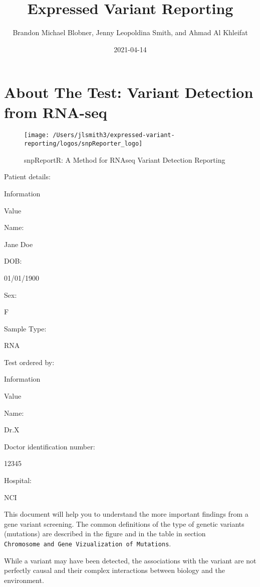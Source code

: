 \documentclass[
]{article}
\title{Expressed Variant Reporting}
\author{Brandon Michael Blobner, Jenny Leopoldina Smith, and Ahmad Al
Khleifat}
\date{2021-04-14}
\begin{document}
\maketitle

{
\setcounter{tocdepth}{3}
\tableofcontents
}
\hypertarget{about-the-test-variant-detection-from-rna-seq}{%
\section{About The Test: Variant Detection from
RNA-seq}\label{about-the-test-variant-detection-from-rna-seq}}

\begin{figure}

{\centering \texttt{[image: /Users/jlsmith3/expressed-variant-reporting/logos/snpReporter\_logo]} 

}

\caption{snpReportR: A Method for RNAseq Variant Detection Reporting}\label{fig:unnamed-chunk-3}
\end{figure}

Patient details:

Information

Value

Name:

Jane Doe

DOB:

01/01/1900

Sex:

F

Sample Type:

RNA

Test ordered by:

Information

Value

Name:

Dr.X

Doctor identification number:

12345

Hospital:

NCI

This document will help you to understand the more important findings
from a gene variant screening. The common definitions of the type of
genetic variants (mutations) are described in the figure and in the
table in section
\texttt{Chromosome\ and\ Gene\ Vizualization\ of\ Mutations}.

While a variant may have been detected, the associations with the
variant are not perfectly causal and their complex interactions between
biology and the environment.
\end{document}

